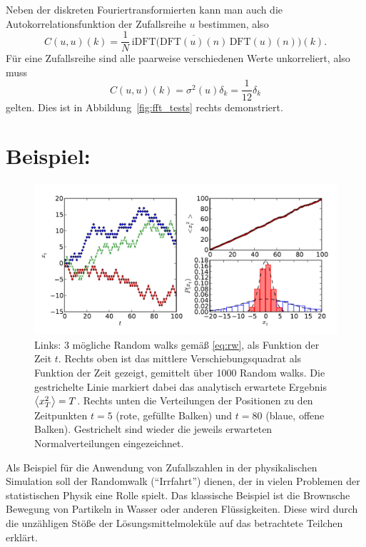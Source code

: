Neben der diskreten Fouriertransformierten kann man auch die
Autokorrelationsfunktion der Zufallsreihe $u$ bestimmen, also
\begin{equation}
  C(u,u)(k) = \frac{1}{N}\,\text{iDFT}
  \bigl(\overline{\text{DFT}(u)(n)}\,\text{DFT}(u)(n)\bigr)(k).
\end{equation}
Für eine Zufallsreihe sind alle paarweise verschiedenen Werte
unkorreliert, also muss
\begin{equation}
  C(u,u)(k) = \sigma^2(u)\delta_k = \frac{1}{12}\delta_k
\end{equation}
gelten. Dies ist in Abbildung~\ref{fig:fft_tests} rechts
demonstriert.

\section{Beispiel: }
\label{sec:rw}

\begin{figure}
  \centering
  \includegraphics[width=\textwidth]{plots/rw}
  \caption{Links: 3 mögliche Random walks gemäß \eqref{eq:rw}, als
    Funktion der Zeit $t$. Rechts oben ist das mittlere
    Verschiebungsquadrat als Funktion der Zeit gezeigt, gemittelt über
    1000 Random walks. Die gestrichelte Linie markiert dabei das
    analytisch erwartete Ergebnis $\left\langle{x_T^2}\right\rangle=T$. Rechts unten
    die Verteilungen der Positionen zu den Zeitpunkten $t=5$ (rote,
    gefüllte Balken) und $t=80$ (blaue, offene Balken). Gestrichelt sind
    wieder die jeweils erwarteten Normalverteilungen eingezeichnet.}
  \label{fig:rw}
\end{figure}

Als Beispiel für die Anwendung von Zufallszahlen in der physikalischen
Simulation soll der Randomwalk ("`Irrfahrt"') dienen, der in vielen
Problemen der statistischen Physik eine Rolle spielt. Das klassische
Beispiel ist die Brownsche Bewegung von Partikeln in Wasser oder
anderen Flüssigkeiten. Diese wird durch die unzähligen Stöße der
Lösungsmittelmoleküle auf das betrachtete Teilchen erklärt.

